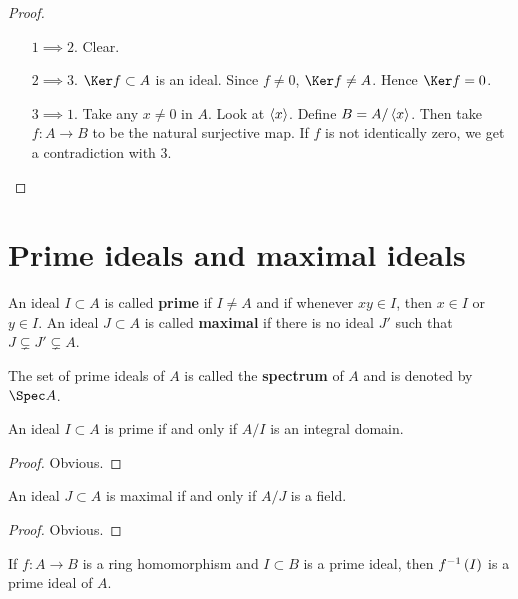 \begin{proof}
\hfill
\begin{itemize}[leftmargin=0.5in]
\item[$ 1 \implies 2 $.] Clear.
\item[$ 2 \implies 3 $.] $ \Ker f \subset A $ is an ideal. Since $ f \ne 0 $, $ \Ker f \ne A $. Hence $ \Ker f = 0 $.
\item[$ 3 \implies 1 $.] Take any $ x \ne 0 $ in $ A $. Look at $ \left\langle x \right\rangle $. Define $ B = A / \left\langle x \right\rangle $. Then take $ f : A \to B $ to be the natural surjective map. If $ f $ is not identically zero, we get a contradiction with $ 3 $.
\end{itemize}
\end{proof}

\pagebreak

\section{Prime ideals and maximal ideals}

\begin{definition}
An ideal $ I \subset A $ is called \textbf{prime} if $ I \ne A $ and if whenever $ xy \in I $, then $ x \in I $ or $ y \in I $. An ideal $ J \subset A $ is called \textbf{maximal} if there is no ideal $ J' $ such that $ J \subsetneq J' \subsetneq A $.
\end{definition}

\begin{notation*}
The set of prime ideals of $ A $ is called the \textbf{spectrum} of $ A $ and is denoted by $ \Spec A $.
\end{notation*}

\begin{lemma}
An ideal $ I \subset A $ is prime if and only if $ A / I $ is an integral domain.
\end{lemma}

\begin{proof}
Obvious.
\end{proof}

\begin{lemma}
An ideal $ J \subset A $ is maximal if and only if $ A / J $ is a field.
\end{lemma}

\begin{proof}
Obvious.
\end{proof}

\begin{proposition}
If $ f : A \to B $ is a ring homomorphism and $ I \subset B $ is a prime ideal, then $ f^{-1}\br{I} $ is a prime ideal of $ A $.
\end{proposition}


